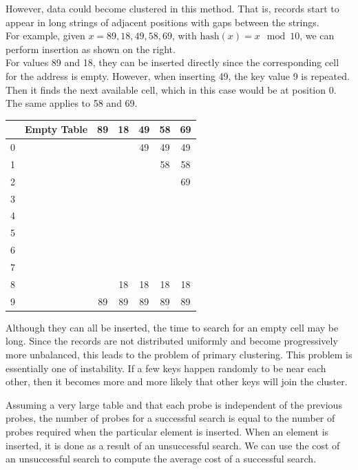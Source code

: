 \begin{minipage}{0.5\textwidth}
However, data could become clustered in this method. That is, records start to appear in long strings of adjacent positions with gaps between the strings.\\[5pt]
For example, given \(x = 89, 18, 49, 58, 69\), with \(\text{hash}(x) = x \mod 10\), we can perform insertion as shown on the right.\\[5pt]
For values 89 and 18, they can be inserted directly since the corresponding cell for the address is empty. However, when inserting 49, the key value 9 is repeated. Then it finds the next available cell, which in this case would be at position 0. The same applies to 58 and 69.
\end{minipage}
\begin{minipage}{0.5\textwidth}
\begin{table}[H]
  \centering
  \begin{tabular}{c|c|c|c|c|c|c}
      \toprule
        & Empty Table & 89 & 18 & 49 & 58 & 69  \\
    \midrule
      0 &  &  &  & 49 & 49 & 49  \\
      1 &  &  &  &  & 58 & 58  \\
      2 &  &  &  &  &  & 69  \\
      3 &  &  &  &  &  &   \\
      4 &  &  &  &  &  &   \\
      5 &  &  &  &  &  &   \\
      6 &  &  &  &  &  &   \\
      7 &  &  &  &  &  &   \\
      8 &  &  & 18 & 18 & 18 & 18  \\
      9 &  & 89 & 89 & 89 & 89 & 89  \\
      \bottomrule
  \end{tabular}
\end{table}
\end{minipage}

Although they can all be inserted, the time to search for an empty cell may be long. Since the records are not distributed uniformly and become progressively more unbalanced, this leads to the problem of primary clustering. This problem is essentially one of instability. If a few keys happen randomly to be near each other, then it becomes more and more likely that other keys will join the cluster.  

Assuming a very large table and that each probe is independent of the previous probes, the number of probes for a successful search is equal to the number of probes required when the particular element is inserted. When an element is inserted, it is done as a result of an unsuccessful search. We can use the cost of an unsuccessful search to compute the average cost of a successful search. 

